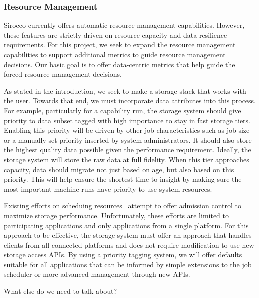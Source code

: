\subsubsection{Resource Management}

Sirocco currently offers automatic resource management capabilities. However,
these features are strictly driven on resource capacity and data resilience
requirements. For this project, we seek to expand the resource management
capabilities to support additional metrics to guide resource management
decisions. Our basic goal is to offer data-centric metrics that help guide the
forced resource management decisions.

As stated in the introduction, we seek to make a storage stack that works with
the user. Towards that end, we must incorporate data attributes into this
process. For example, particularly for a capability run, the storage system
should give priority to data subset tagged with high importance to stay in fast
storage tiers. Enabling this priority will be driven by other job
characteristics such as job size or a manually set priority inserted by system
administrators. It should also store the highest quality data possible given
the performance requirement. Ideally, the storage system will store the raw
data at full fidelity. When this tier approaches capacity, data should migrate
not just based on age, but also based on this priority. This will help ensure
the shortest time to insight by making sure the most important machine runs
have priority to use system resources.

Existing efforts on scheduing resources~\cite{io-cop,dorier} attempt to offer
admission control to maximize storage performance. Unfortunately, these efforts 
are limited to participating applications and only applications from a single
platform. For this approach to be effective, the storage system must offer an
approach that handles clients from all connected platforms and does not
require modification to use new storage access APIs. By using a priority
tagging system, we will offer defaults suitable for all applications that can
be informed by simple extensions to the job scheduler or more advanced
management through new APIs.

What else do we need to talk about?

